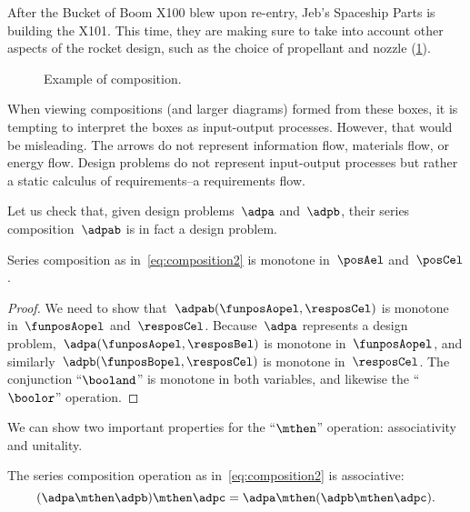 \begin{example}
    After the Bucket of Boom X100 blew upon re-entry, Jeb's Spaceship Parts is building the X101.
    This time, they are making sure to take into account other aspects of the rocket design, such as the choice of propellant and nozzle (\cref{fig:examplecomposition}).
    \begin{figure}[h!]
        \centering
        \caption{Example of composition. }
        \label{fig:examplecomposition}
    \end{figure}
\end{example}

\begin{remark}
    When viewing compositions (and larger diagrams) formed from these boxes, it is tempting to interpret the boxes as input-output processes.
    However, that would be misleading.
    The arrows do not represent information flow, materials flow, or energy flow.
    Design problems do not represent input-output processes but rather a static calculus of requirements--a requirements flow.
\end{remark}

Let us check that, given design problems~$\adpa$ and~$\adpb$, their series composition~$\adpab$ is in fact a design problem.
\begin{lemma}
    Series composition as in~\cref{eq:composition2} is monotone in~$\posAel$ and~$\posCel$.
\end{lemma}
\begin{proof}
    We need to show that~$\adpab(\funposAopel,\resposCel)$ is monotone in~$\funposAopel$ and~$\resposCel$.
    Because~$\adpa$ represents a design problem,~$\adpa(\funposAopel,\resposBel)$ is monotone in~$\funposAopel$, and similarly~$\adpb(\funposBopel,\resposCel)$ is monotone in~$\resposCel$.
    The conjunction ``$\booland$'' is monotone in both variables, and likewise the ``$\boolor$'' operation.
\end{proof}

We can show two important properties for the ``$\mthen$'' operation: associativity and unitality.
\begin{lemma}
    The series composition operation as in~\cref{eq:composition2} is associative:
    \begin{equation}
        (\adpa\mthen \adpb)
        \mthen \adpc = \adpa\mthen (\adpb\mthen \adpc).
    \end{equation}
\end{lemma}

